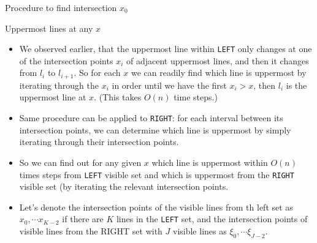 \documentclass{article}
\begin{document}
\begin{frame}{Procedure to find intersection $x_0$}

  \begin{block}{Uppermost lines at any $x$}
    \begin{itemize}
    \item We observed earlier, that the uppermost line within \texttt{LEFT}
      only changes at one of the intersection points $x_i$ of adjacent uppermost
      lines, and then it changes from $l_i$ to $l_{i+1}$. 
      So for each $x$ we can readily find which line is uppermost by
      iterating through the $x_i$ in order until we have the first $x_i
      > x$, then $l_i$ is the uppermost line at $x$. (This takes $O(n)$ time steps.)
    \item Same procedure can be applied to \texttt{RIGHT}: for each
      interval between its intersection points, we can determine which
      line is uppermost by simply iterating through their intersection
      points.
    \item So we can find out for any given $x$ which line is uppermost
      within $O(n)$ times steps from \texttt{LEFT} visible set and which is
      uppermost from the \texttt{RIGHT} visible set (by iterating the
      relevant intersection points.
    \item Let's denote the intersection points of the visible lines from
      th left set as $x_0,\cdots x_{K-2}$ if there are $K$ lines in the
      \texttt{LEFT} set, and the intersection points of visible lines
      from the RIGHT set with $J$ visible lines as $\xi_0, \cdots
      \xi_{J-2}$.
    \end{itemize}
  \end{block}
\end{frame}  
\end{document}
